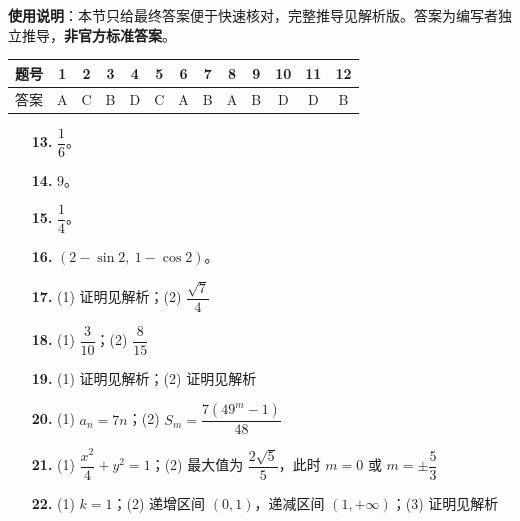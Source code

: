 
\begin{gknotice}
\textbf{使用说明}：本节只给最终答案便于快速核对，完整推导见解析版。答案为编写者独立推导，\textbf{非官方标准答案}。
\end{gknotice}

\begin{center}\begin{tabular}{ccccccccccccc}
\toprule
题号 & 1 & 2 & 3 & 4 & 5 & 6 & 7 & 8 & 9 & 10 & 11 & 12 \\
\midrule
答案 & A & C & B & D & C & A & B & A & B & D & D & B \\
\bottomrule
\end{tabular}\end{center}

\begin{itemize}[leftmargin=2.6em]
  \item[\textbf{13.}] $\dfrac16$。
  \item[\textbf{14.}] $9$。
  \item[\textbf{15.}] $\dfrac14$。
  \item[\textbf{16.}] $(2-\sin2,\ 1-\cos2)$。
\end{itemize}

\begin{itemize}[leftmargin=2.6em]
  \item[\textbf{17.}] (1) 证明见解析；(2) $\dfrac{\sqrt7}4$
  \item[\textbf{18.}] (1) $\dfrac3{10}$；(2) $\dfrac8{15}$
  \item[\textbf{19.}] (1) 证明见解析；(2) 证明见解析
  \item[\textbf{20.}] (1) $a_n=7n$；(2) $S_m=\dfrac{7(49^m-1)}{48}$
  \item[\textbf{21.}] (1) $\dfrac{x^2}4+y^2=1$；(2) 最大值为 $\dfrac{2\sqrt5}5$，此时 $m=0$ 或 $m=\pm\dfrac53$
  \item[\textbf{22.}] (1) $k=1$；(2) 递增区间 $(0,1)$，递减区间 $(1,+\infty)$；(3) 证明见解析
\end{itemize}
